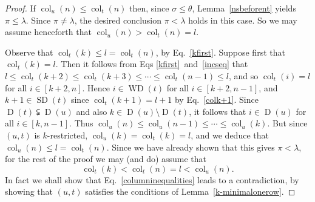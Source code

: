 \documentclass[ALCO,ThmDefs,Unicode,epreuves]{cedram}
\DeclareMathOperator{\col}{col}
\DeclareMathOperator{\SD}{SD}
\DeclareMathOperator{\WD}{WD}
\DeclareMathOperator{\D}{D}
\begin{document}
\begin{proof}
If $\col_u(n)\leqslant\col_t(n)$ then, since $\sigma\leqslant \theta$,
Lemma~\ref{nsbeforent} yields $\pi\leqslant\lambda$. Since
$\pi\neq\lambda$, the desired conclusion $\pi<\lambda$ holds in this case.
So we may assume henceforth that $\col_u(n)>\col_t(n)=l$.

Observe that $\col_t(k)\leqslant l=\col_t(n)$, by Eq.~\eqref{kfirst}. Suppose
first that $\col_t(k)=l$. Then it follows from Eqs \eqref{kfirst}~and~\eqref{incseq} that
$l\leqslant\col_t(k+2)\leqslant\col_t(k+3)\leqslant\cdots\leqslant\col_t(n-1)\leqslant l$,
and so $\col_t(i)=l$ for all $i\in[k+2,n]$. Hence $i\in\WD(t)$ for all $i\in[k+2,n-1]$,
and $k+1\in\SD(t)$ since $\col_t(k+1)=l+1$ by Eq.~\eqref{colk+1}.
Since $\D(t)\subsetneqq\D(u)$ and also $k\in\D(u)\setminus\D(t)$, it follows that
$i\in\D(u)$ for all $i\in[k,n-1]$. Thus
$\col_u(n)\leqslant\col_u(n-1)\leqslant\cdots\leqslant\col_u(k)$. But
since $(u,t)$ is $k$-restricted, $\col_u(k)=\col_t(k)=l$, and
we deduce that $\col_u(n)\leqslant l=\col_t(n)$. Since we have already shown that
this gives $\pi<\lambda$, for the rest of the proof we may (and do) assume that
\begin{equation}\label{columninequalities}
\col_t(k)<\col_t(n)=l<\col_u(n).
\end{equation}
In fact we shall show that Eq.~\eqref{columninequalities} leads to a contradiction,
by showing that $(u,t)$ satisfies the conditions of Lemma~\ref{k-minimalonerow}.


\end{proof}
\end{document}
